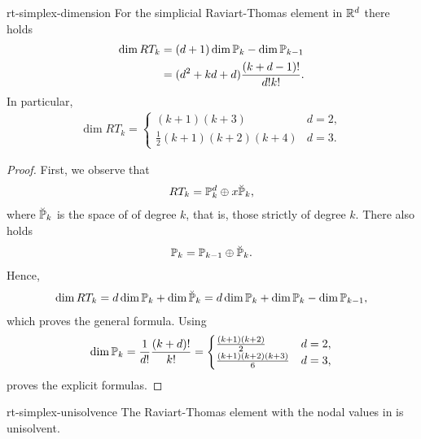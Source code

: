 \begin{Lemma}{rt-simplex-dimension}
  For the simplicial Raviart-Thomas element in $\R^d$ there
  holds
  \begin{gather}
    \label{eq:darcy:25}
    \begin{split}
      \dim RT_k &= (d+1)\dim\P_k - \dim \P_{k-1}
      \\
      &= (d^2+k d+d)\frac{(k+d-1)!}{d!k!}.
    \end{split}
  \end{gather}
  In particular,
  \begin{gather}
    \label{eq:darcy:23}
    \dim RT_k =
    \begin{cases}
      (k+1)(k+3) & d=2,
      \\
      \tfrac12 (k+1)(k+2)(k+4) & d=3.
    \end{cases}
  \end{gather}
\end{Lemma}

\begin{proof}
  First, we observe that
  \begin{gather}
    RT_k = \P_k^d \oplus x\breve\P_k,
  \end{gather}
  where $\breve \P_k$ is the space of  of degree $k$, that is, those strictly of degree
  $k$. There also holds
  \begin{gather}
    \P_{k} = \P_{k-1} \oplus \breve \P_k.
  \end{gather}
  Hence,
  \begin{gather}
    \dim RT_k = d \dim \P_k + \dim\breve\P_k = d \dim \P_k + \dim \P_k
    - \dim \P_{k-1},
  \end{gather}
  which proves the general formula. Using
  \begin{gather}
    \dim\P_k
    =\frac1{d!} \frac{(k+d)!}{k!}
    =
    \begin{cases}
      \frac{(k+1)(k+2)}{2} & d=2,\\
      \frac{(k+1)(k+2)(k+3)}{6} & d=3,
    \end{cases}
  \end{gather}
  proves the explicit formulas.
\end{proof}

\begin{Lemma}{rt-simplex-unisolvence}
  The Raviart-Thomas element with the nodal values in
   is unisolvent.
\end{Lemma}

